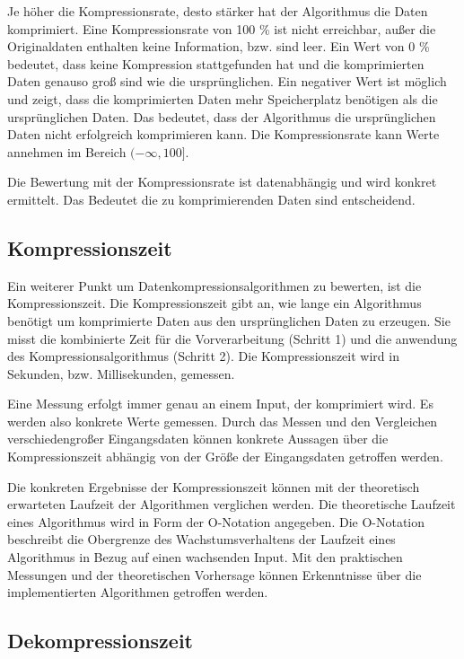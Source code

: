 \documentclass[conference]{IEEEtran}
\begin{document}
Je höher die Kompressionsrate, desto stärker hat der Algorithmus die Daten
komprimiert.
Eine Kompressionsrate von 100 \% ist nicht erreichbar, außer die Originaldaten enthalten
keine Information, bzw. sind leer.
Ein Wert von 0 \% bedeutet, dass keine Kompression stattgefunden hat und die komprimierten
Daten genauso groß sind wie die ursprünglichen.
Ein negativer Wert ist möglich und zeigt, dass die komprimierten Daten mehr Speicherplatz
benötigen als die ursprünglichen Daten.
Das bedeutet, dass der Algorithmus die ursprünglichen Daten nicht erfolgreich
komprimieren kann.
Die Kompressionsrate kann Werte annehmen im Bereich $(-\infty, 100]$.

Die Bewertung mit der Kompressionsrate ist datenabhängig und wird konkret
ermittelt.
Das Bedeutet die zu komprimierenden Daten sind entscheidend.

\subsection{Kompressionszeit}

Ein weiterer Punkt um Datenkompressionsalgorithmen zu bewerten, ist die
Kompressionszeit.
Die Kompressionszeit gibt an, wie lange ein Algorithmus benötigt um
komprimierte Daten aus den ursprünglichen Daten zu erzeugen.
Sie misst die kombinierte Zeit für die Vorverarbeitung (Schritt 1) und die
anwendung des Kompressionsalgorithmus (Schritt 2).
Die Kompressionszeit wird in Sekunden, bzw. Millisekunden, gemessen.

Eine Messung erfolgt immer genau an einem Input, der komprimiert wird.
Es werden also konkrete Werte gemessen.
Durch das Messen und den Vergleichen verschiedengroßer Eingangsdaten können konkrete
Aussagen über die Kompressionszeit abhängig von der Größe der
Eingangsdaten getroffen werden.

Die konkreten Ergebnisse der Kompressionszeit können mit der
theoretisch erwarteten Laufzeit der Algorithmen verglichen werden.
Die theoretische Laufzeit eines Algorithmus wird in Form der O-Notation
angegeben.
Die O-Notation beschreibt die Obergrenze des Wachstumsverhaltens der Laufzeit
eines Algorithmus in Bezug auf einen wachsenden Input. \cite{chivers}
Mit den praktischen Messungen und der theoretischen Vorhersage können
Erkenntnisse über die implementierten Algorithmen getroffen werden.


\subsection{Dekompressionszeit}
\end{document}
